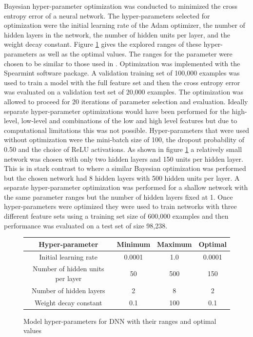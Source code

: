 \documentclass[12pt,letterpaper]{article}
\begin{document}
Bayesian hyper-parameter optimization was conducted to minimized the cross entropy error of a neural network.  The hyper-parameters selected for optimization were the initial learning rate of the Adam optimizer, the number of hidden layers in the network, the number of hidden units per layer, and the weight decay constant.  Figure \ref{fig:hypers} gives the explored ranges of these hyper-parameters as well as the optimal values.  The ranges for the parameter were chosen to be similar to those used in \cite{Baldi:2014pta}. Optimization was implemented with the Spearmint software package.  A validation training set of 100,000 examples was used to train a model with the full feature set and then the cross entropy error was evaluated on a validation test set of 20,000 examples.  The optimization was allowed to proceed for 20 iterations of parameter selection and evaluation.  Ideally separate hyper-parameter optimizations would have been performed for the high-level, low-level and combinations of the low and high level features but due to computational limitations this was not possible. Hyper-parameters that were used without optimization were the mini-batch size of 100, the dropout probability of 0.50 and the choice of ReLU activations.  As shown in figure \ref{fig:hypers} a relatively small network was chosen with only two hidden layers and 150 units per hidden layer.  This is in stark contrast to \cite{Baldi:2014pta} where a similar Bayesian optimization was performed but the chosen network had 8 hidden layers with 500 hidden units per layer.  A separate hyper-parameter optimization was performed for a shallow network with the same parameter ranges but the number of hidden layers fixed at 1.  Once hyper-parameters were optimized they were used to train networks with three different feature sets using a training set size of 600,000 examples and then performance was evaluated on a test set of size 98,238.

\begin{figure}
\begin{center}
\tiny
 \begin{tabular}{|c| c c c|} 
 \hline
 Hyper-parameter & Minimum & Maximum & Optimal\\ [0.5ex] 
 \hline\hline
 Initial learning rate & 0.0001 & 1.0 & 0.0001 \\[1ex] 
 \hline
 Number of hidden units per layer & 50 & 500 & 150 \\[1ex]
 \hline
 Number of hidden layers & 2 & 8 & 2 \\[1ex]
 \hline
 Weight decay constant & 0.1 & 100 & 0.1 \\[1ex]
 \hline

\end{tabular}
\caption{Model hyper-parameters for DNN with their ranges and optimal values}
\label{fig:hypers}
\end{center}
\end{figure}
\end{document}
